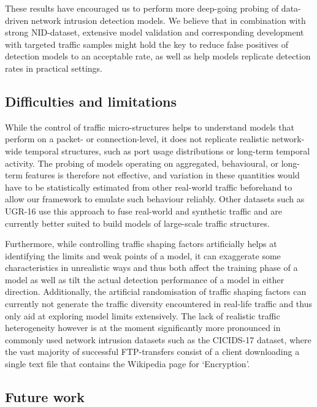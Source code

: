 \documentclass[runningheads]{llncs}
\begin{document}
These results have encouraged us to perform more deep-going probing of data-driven network intrusion detection models. We believe that in combination with strong NID-dataset, extensive model validation and corresponding development with targeted traffic samples might hold the key to reduce false positives of detection models to an acceptable rate, as well as help models replicate detection rates in practical settings.

\subsection{Difficulties and limitations}

While the control of traffic micro-structures helps to understand models that perform on a packet- or connection-level, it does not replicate realistic network-wide temporal structures, such as port usage distributions or long-term temporal activity. The probing of models operating on aggregated, behavioural, or long-term features is therefore not effective, and variation in these quantities would have to be statistically estimated from other real-world traffic beforehand to allow our framework to emulate such behaviour reliably. Other datasets such as UGR-16 use this approach to fuse real-world and synthetic traffic and are currently better suited to build models of large-scale traffic structures.

Furthermore, while controlling traffic shaping factors artificially helps at identifying the limits and weak points of a model, it can exaggerate some characteristics in unrealistic ways and thus both affect the training phase of a model as well as tilt the actual detection performance of a model in either direction. Additionally, the artificial randomisation of traffic shaping factors can currently not generate the traffic diversity encountered in real-life traffic and thus only aid at exploring model limits extensively. The lack of realistic traffic heterogeneity however is at the moment significantly more pronounced in commonly used network intrusion datasets such as the CICIDS-17 dataset, where the vast majority of successful FTP-transfers consist of a client downloading a single text file that contains the Wikipedia page for ‘Encryption’.

\subsection{Future work}
\end{document}
